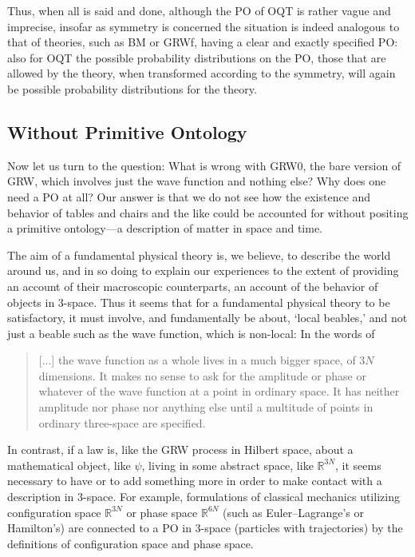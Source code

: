\documentclass[12pt]{article}
\newcommand{\RRR}{\mathbb{R}}
\begin{document}
      
Thus, when all is said and done, although the PO of {\sf OQT} is rather vague and imprecise, insofar as symmetry is concerned the situation is  indeed  analogous to that of theories, such as {\sf BM} or {\sf GRWf},  having  a clear and exactly specified  PO: also for {\sf
 OQT} the possible probability distributions on the PO, those that are allowed by the theory,  when transformed according to the symmetry, will again be  possible probability distributions for the theory.
 

 
\subsection{Without Primitive Ontology}
\label{sec:grw0}

Now let us turn to the question: What is wrong with {\sf GRW0}, the bare version of {\sf GRW}, which involves just the wave function and nothing else? Why does one need a PO at all? 
Our answer is that we do not see how the existence and behavior of
 tables and chairs and the like could be accounted for without positing a
 primitive ontology---a description of matter in space and time.

 The aim of a fundamental physical theory is, we believe, to describe the
 world around us, and in so doing to explain our experiences to the extent
 of providing an account of their macroscopic counterparts, an account of
 the behavior of objects in $3$-space. Thus it seems that for a fundamental
 physical theory to be satisfactory, it must involve, and fundamentally be
 about, `local beables,' and not just a beable such as the wave function,
 which is non-local: In the words of \citet{Bell87}
\begin{quote}
  [...] the wave function as a whole lives in a much bigger space, of 
  $3N$ dimensions. It makes no sense to ask for the amplitude or 
  phase or whatever of the wave function at a point in ordinary space. 
  It has neither amplitude nor phase nor anything else until a 
  multitude of points in ordinary three-space are specified.
\end{quote}

In contrast, if a law is, like the {\sf GRW} process in Hilbert space,
about a mathematical object, like $\psi$, living in some abstract space,
like $\RRR^{3N}$, it seems necessary to have or to add something more in
order to make contact with a description in 3-space. For example,
formulations of classical mechanics utilizing configuration space
$\RRR^{3N}$ or phase space $\RRR^{6N}$ (such as Euler--Lagrange's or
Hamilton's) are connected to a PO in 3-space (particles with trajectories)
by the definitions of configuration space and phase space.
\end{document}
